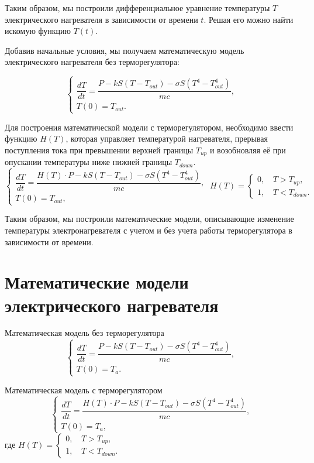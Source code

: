 	Таким образом, мы построили дифференциальное уравнение температуры \( T \) электрического нагревателя в зависимости от времени \( t \). Решая его можно найти искомую функцию \( T(t) \).

	Добавив начальные условия, мы получаем математическую модель электрического нагревателя без терморегулятора:

	\[
		\begin{cases}
			\dfrac{d T}{dt} = \dfrac{P - kS \left(T - T_{out} \right) - \sigma S \left(T^4 - T_{out}^4 \right)}{mc}, \\
			T(0) = T_{out}.
		\end{cases}
	\]

	Для построения математической модели с терморегулятором, необходимо ввести функцию \( H(T) \), которая управляет температурой нагревателя, прерывая поступления тока при превышении верхней границы \( T_{up} \) и возобновляя её при опускании температуры ниже нижней границы \( T_{down} \).
	\[
		\begin{cases}
			\dfrac{d T}{dt} = \dfrac{H(T) \cdot P - kS \left(T - T_{out} \right) - \sigma S \left(T^4 - T_{out}^4 \right)}{mc}, \\
			T(0) = T_{out}, 
		\end{cases} 
		~ H(T) = \begin{cases}
			0, \, &T > T_{up}, \\
			1, \, &T < T_{down}.
		\end{cases}
	\]

	Таким образом, мы построили математические модели, описывающие изменение температуры электронагревателя с учетом и без учета работы терморегулятора в зависимости от времени.

	\section{Математические модели электрического нагревателя}
		Математическая модель без терморегулятора
			\[
				\begin{cases}
					\dfrac{d T}{dt} = \dfrac{P - kS \left(T - T_{out} \right) - \sigma S \left(T^4 - T_{out}^4 \right)}{mc}, \\
					T(0) = T_a.
				\end{cases}
			\]

		Математическая модель с терморегулятором
			\[
				\begin{cases}
					\dfrac{d T}{dt} = \dfrac{H(T) \cdot P - kS \left(T - T_{out} \right) - \sigma S \left(T^4 - T_{out}^4 \right)}{mc}, \\
					T(0) = T_a, 
				\end{cases}
			\] где 
			\(
				H(T) = \begin{cases}
					0, \, &T > T_{up}, \\
					1, \, &T < T_{down}.
				\end{cases} 
			\)

